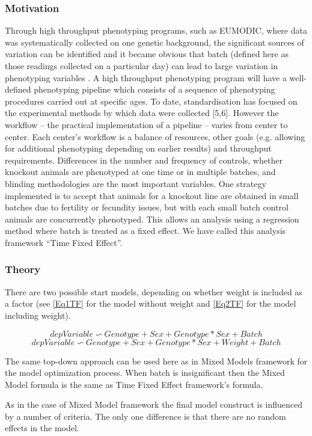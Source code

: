 \documentclass[12pt,a4paper]{article}
\begin{document}
\subsubsection{Motivation}
Through high throughput phenotyping programs, such as EUMODIC, where data was systematically collected on one genetic background, the significant sources of variation can be identified and it became obvious that batch (defined here as those readings collected on a particular day) can lead to large variation in phenotyping variables \cite{MM12}. A high throughput phenotyping program will have a well-defined phenotyping pipeline which consists of a sequence of phenotyping procedures carried out at specific ages. To date, standardisation has focused on the experimental methods by which data were collected [5,6]. However the workflow -- the practical implementation of a pipeline -- varies from center to center. Each center’s workflow is a balance of resources, other goals (e.g. allowing for additional phenotyping depending on earlier results) and throughput requirements. Differences in the number and frequency of controls, whether knockout animals are phenotyped at one time or in multiple batches, and blinding methodologies are the most important variables. One strategy implemented is to accept that animals for a knockout line are obtained in small batches due to fertility or fecundity issues, but with each small batch control animals are concurrently phenotyped. This allows an analysis using a regression method where batch is treated as a fixed effect. We have called this analysis framework “Time Fixed Effect”. 
\subsubsection{Theory}
There are two possible start models, depending on whether weight is included as a factor (see \ref{Eq1TF} for the model without weight and \ref{Eq2TF} for the model including weight).

\[
depVariable \backsim Genotype + Sex +
Genotype*Sex + Batch \tag{Eq3}\label{Eq1TF}
\]
\[
depVariable \backsim Genotype + Sex +
Genotype*Sex + Weight + Batch\tag{Eq4}\label{Eq2TF}
\]

The same top-down approach can be used here as in Mixed Models framework for the model optimization process. When batch is insignificant then the Mixed Model formula is the same as Time Fixed Effect framework's formula.

As in the case of Mixed Model framework the final model construct is influenced by a number of criteria. The only one difference is that there are no random effects in the model. 
\end{document}

